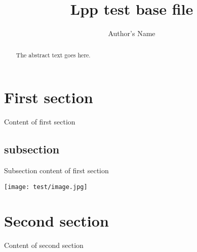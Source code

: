 \documentclass{article}
\begin{document}
\title{Lpp test base file}
\author{Author's Name}

\maketitle

\begin{abstract}
The abstract text goes here.
\end{abstract}


\section{First section}
Content of first section



\subsection{subsection}
Subsection content of first section

\texttt{[image: test/image.jpg]}

\section{Second section}
Content of second section
\end{document}
